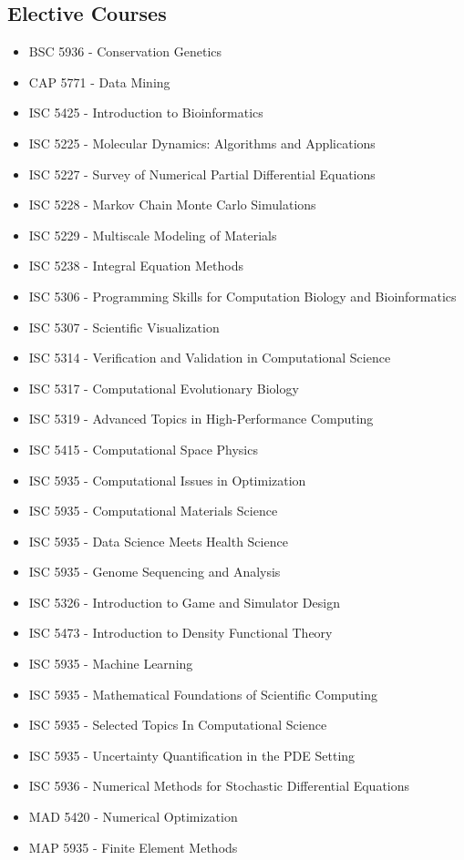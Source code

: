\documentclass[12pt,a4paper]{article}
\begin{document}
\subsection*{Elective Courses}
\begin{itemize}
    \item BSC 5936 - Conservation Genetics
    \item CAP 5771 - Data Mining
    \item ISC 5425 - Introduction to Bioinformatics
    \item ISC 5225 - Molecular Dynamics: Algorithms and Applications
    \item ISC 5227 - Survey of Numerical Partial Differential Equations
    \item ISC 5228 - Markov Chain Monte Carlo Simulations
    \item ISC 5229 - Multiscale Modeling of Materials
    \item ISC 5238 - Integral Equation Methods
    \item ISC 5306 - Programming Skills for Computation Biology and Bioinformatics
    \item ISC 5307 - Scientific Visualization
    \item ISC 5314 - Verification and Validation in Computational Science
    \item ISC 5317 - Computational Evolutionary Biology
    \item ISC 5319 - Advanced Topics in High-Performance Computing
    \item ISC 5415 - Computational Space Physics
    \item ISC 5935 - Computational Issues in Optimization
    \item ISC 5935 - Computational Materials Science
    \item ISC 5935 - Data Science Meets Health Science
    \item ISC 5935 - Genome Sequencing and Analysis
    \item ISC 5326 - Introduction to Game and Simulator Design
    \item ISC 5473 - Introduction to Density Functional Theory
    \item ISC 5935 - Machine Learning
    \item ISC 5935 - Mathematical Foundations of Scientific Computing
    \item ISC 5935 - Selected Topics In Computational Science
    \item ISC 5935 - Uncertainty Quantification in the PDE Setting
    \item ISC 5936 - Numerical Methods for Stochastic Differential Equations
    \item MAD 5420 - Numerical Optimization
    \item MAP 5935 - Finite Element Methods
\end{itemize}
\end{document}
